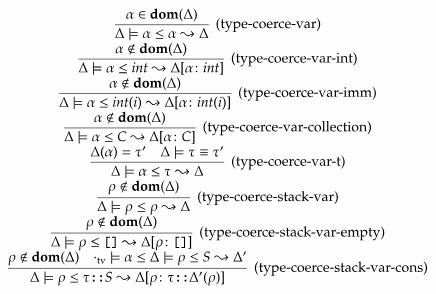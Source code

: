 \begin{equation*}
    \begin{array}{c}
        \infer[(\text{type-coerce-var})]
            {\Delta \models \alpha \leq \alpha \leadsto \Delta}
            {\alpha \in \dom(\Delta)}
        \\
        \infer[(\text{type-coerce-var-int})]
            {
                \Delta \models
                \alpha \leq int 
                \leadsto \Delta[\alpha \colon int]}
            {
                \alpha \not \in \dom(\Delta)
            }
        \\
        \infer[(\text{type-coerce-var-imm})]
            {
                \Delta \models
                \alpha \leq int(i)
                \leadsto \Delta[\alpha \colon int(i)]}
            {
                \alpha \not \in \dom(\Delta)
            }
        \\
        \infer[(\text{type-coerce-var-collection})]
            {
                \Delta \models
                \alpha \leq C
                \leadsto \Delta[\alpha \colon C]}
            {
                \alpha \not \in \dom(\Delta)
            }
        \\
        \infer[(\text{type-coerce-var-t})]
            {
                \Delta \models
                \alpha \leq \tau
                \leadsto \Delta}
            {
                \Delta(\alpha) = \tau' &
                \Delta \models \tau \equiv \tau'
            }
        \\
        \infer[(\text{type-coerce-stack-var})]
            {
                \Delta \models
                \rho \leq \rho
                \leadsto \Delta
            }
            {
                \rho \not \in \dom(\Delta)
            }
        \\
        \infer[(\text{type-coerce-stack-var-empty})]
            {
                \Delta \models
                \rho \leq \emptystack
                \leadsto \Delta[\rho \colon \emptystack]
            }
            {
                \rho \not \in \dom(\Delta)
            }
        \\
        \infer[(\text{type-coerce-stack-var-cons})]
            {
                \Delta \models
                \rho \leq \tau \cons S
                \leadsto \Delta[\rho \colon \tau \cons \Delta'(\rho)]
            }
            {
                \rho \not \in \dom(\Delta) &
                \emptytv \models \alpha \leq 
                \Delta \models \rho \leq S \leadsto \Delta'
            }
        \\

\end{array}
\end{equation*}
